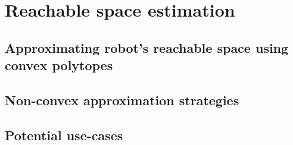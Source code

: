 \chapter{Reachable space estimation} %

\label{ch:reachable_space} %


\section{Approximating robot's reachable space using convex polytopes}

\section{Non-convex approximation strategies}
\section{Potential use-cases}